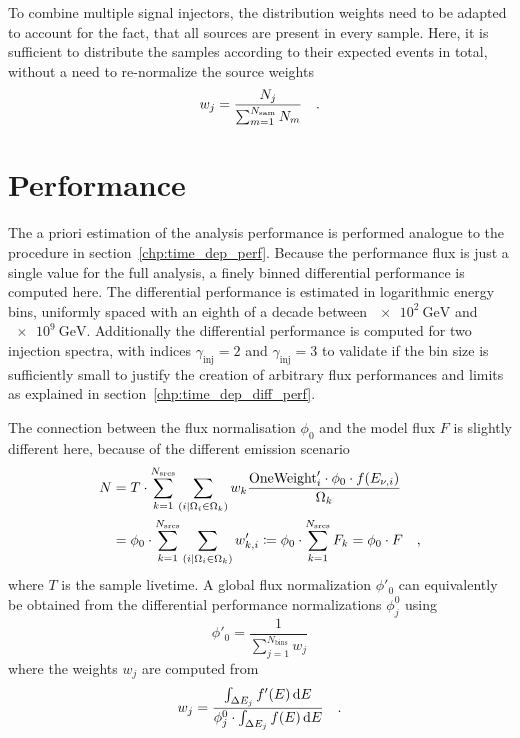 To combine multiple signal injectors, the distribution weights need to be adapted to account for the fact, that all sources are present in every sample.
Here, it is sufficient to distribute the samples according to their expected events in total, without a need to re-normalize the source weights
\begin{equation}
  w_j = \frac{N_j}{\sum_{m=1}^{N_\text{sam}}N_m}
  \quad\text{.}
\end{equation}


\section{Performance}
The a priori estimation of the analysis performance is performed analogue to the procedure in section~\ref{chp:time_dep_perf}.
Because the performance flux is just a single value for the full analysis, a finely binned differential performance is computed here.
The differential performance is estimated in logarithmic energy bins, uniformly spaced with an eighth of a decade between $\SI{e2}{\GeV}$ and $\SI{e9}{\GeV}$.
Additionally the differential performance is computed for two injection spectra, with indices $\gamma_\text{inj} = 2$ and $\gamma_\text{inj} = 3$ to validate if the bin size is sufficiently small to justify the creation of arbitrary flux performances and limits as explained in section~\ref{chp:time_dep_diff_perf}.

The connection between the flux normalisation $\phi_0$ and the model flux $F$ is slightly different here, because of the different emission scenario
\begin{align}
  N
  &= T\cdot\sum_{k=1}^{N_\text{srcs}} \sum_{(i|\Omega_i \in \Omega_k)}
      w_k\frac{\text{OneWeight}'_i\cdot\phi_0\cdot f(E_{\nu,i})}{\Omega_k} \\
  &= \phi_0 \cdot
      \sum_{k=1}^{N_\text{srcs}}
      \sum_{(i|\Omega_i \in \Omega_k)} w'_{k,i}
  \coloneqq \phi_0 \cdot \sum_{k=1}^{N_\text{srcs}} F_k = \phi_0 \cdot F
  \quad\text{,}
\end{align}
where $T$ is the sample livetime.
A global flux normalization $\phi'_0$ can equivalently be obtained from the differential performance normalizations $\phi_j^0$ using
\begin{equation}
  \phi'_0 = \frac{1}{\sum_{j=1}^{N_\text{bins}} w_j}
\end{equation}
where the weights $w_j$ are computed from
\begin{equation}
  w_j = \frac{\int_{\Delta E_j} f'(E)\,\text{d}E}
             {\phi_j^0\cdot\int_{\Delta E_j} f(E)\,\text{d}E}
  \quad\text{.}
\end{equation}


